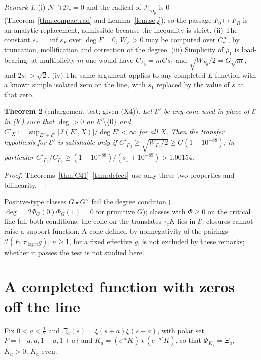 \documentclass[11pt]{amsart}
\newtheorem{theorem}{Theorem}[section]
\theoremstyle{definition}
\theoremstyle{remark}
\newtheorem{remark}[theorem]{Remark}
\newcommand{\Nr}{\mathcal N}
\newcommand{\Ef}{\mathcal E}
\newcommand{\I}{\mathcal I}
\newcommand{\dg}{\deg}
\begin{document}
\begin{remark}
(i) $\Nr\cap\mathcal D_c=0$ and the radical of $\I|_{\mathcal D_p}$ is $0$ (Theorem~\ref{thm:compactrad} and
Lemma~\ref{lem:sep}), so the passage $F_0\mapsto F_R$ is an analytic replacement, admissible because the
inequality is strict. (ii) The constant $s_*=\inf s_F$ over $\dg F=0$, $W_F>0$ may be computed over $C_c^\infty$,
by truncation, mollification and correction of the degree. (iii) Simplicity of $\rho_1$ is load-bearing: at
multiplicity $m$ one would have $C_{F_0}=mGs_1$ and $\sqrt{W_{F_0}/2}=G\sqrt m$, and $2s_1>\sqrt2$.
(iv) The same argument applies to any completed $L$-function with a known simple isolated zero on the line,
with $s_1$ replaced by the value of $s$ at that zero.
\end{remark}

\begin{theorem}[enlargement test; given (X4)]\label{thm:enlarge}
Let $\Ef'$ be any cone used in place of $\Ef$ in (b$'$) such that $\dg>0$ on $\Ef'\setminus\{0\}$ and
$C'_X:=\sup_{E'\in\Ef'}|\I(E',X)|/\dg E'<\infty$ for all $X$. Then the transfer hypothesis for $\Ef'$ is satisfiable
only if $C'_{F_0}\ge\sqrt{W_{F_0}/2}\ge G(1-10^{-88})$; in particular
$C'_{F_0}/C_{F_0}\ge(1-10^{-88})/(s_1+10^{-89})>1.00154$.
\end{theorem}
\begin{proof}
Theorems~\ref{thm:C41}--\ref{thm:defect} use only these two properties and bilinearity.
\end{proof}
Positive-type classes $G\star G^\vee$ fail the degree condition ($\dg=2\Phi_G(0)\Phi_G(1)=0$ for primitive $G$);
classes with $\Phi\ge0$ on the critical line fail both conditions; the cone on the translates $\tau_cK$ lies in
$\Ef$; closures cannot raise a support function. A cone defined by nonnegativity of the pairings
$\I(E,\tau_{\log n}g)$, $n\ge1$, for a fixed effective $g$, is not excluded by these remarks; whether it passes the test is not studied here.

\section{A completed function with zeros off the line}\label{sec:xia}

Fix $0<a<\frac12$ and $\Xi_a(s)=\xi(s+a)\xi(s-a)$, with polar set $P=\{-a,a,1-a,1+a\}$ and
$K_a=(e^{at}K)\star(e^{-at}K)$, so that $\Phi_{K_a}=\Xi_a$, $K_a>0$, $K_a$ even.
\end{document}
